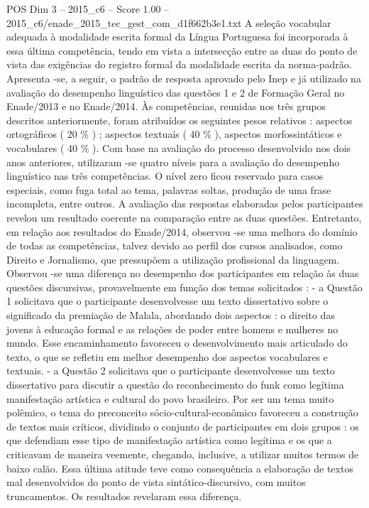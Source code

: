 \begin{textsample}{POS Dim 3 – 2015\_c6 – Score 1.00 – 2015\_c6/enade\_2015\_tec\_gest\_com\_d1f662b3e1.txt}
A seleção vocabular adequada à modalidade escrita formal da Língua Portuguesa foi incorporada à essa última competência, tendo em vista a intersecção entre as duas do ponto de vista das exigências do registro formal da modalidade escrita da norma-padrão.
Apresenta -se, a seguir, o padrão de resposta aprovado pelo Inep e já utilizado na avaliação do desempenho linguístico das questões 1 e 2 de Formação Geral no Enade/2013 e no Enade/2014.
Às competências, reunidas nos três grupos descritos anteriormente, foram atribuídos os seguintes pesos relativos : aspectos ortográficos ( 20 \% ) ; aspectos textuais ( 40 \% ), aspectos morfossintáticos e vocabulares ( 40 \% ).
Com base na avaliação do processo desenvolvido nos dois anos anteriores, utilizaram -se quatro níveis para a avaliação do desempenho linguístico nas três competências.
O nível zero ficou reservado para casos especiais, como fuga total ao tema, palavras soltas, produção de uma frase incompleta, entre outros.
A avaliação das respostas elaboradas pelos participantes revelou um resultado coerente na comparação entre as duas questões.
Entretanto, em relação aos resultados do Enade/2014, observou -se uma melhora do domínio de todas as competências, talvez devido ao perfil dos cursos analisados, como Direito e Jornalismo, que pressupõem a utilização profissional da linguagem.
Observou -se uma diferença no desempenho dos participantes em relação às duas questões discursivas, provavelmente em função dos temas solicitados : - a Questão 1 solicitava que o participante desenvolvesse um texto dissertativo sobre o significado da premiação de Malala, abordando dois aspectos : o direito das jovens à educação formal e as relações de poder entre homens e mulheres no mundo.
Esse encaminhamento favoreceu o desenvolvimento mais articulado do texto, o que se refletiu em melhor desempenho dos aspectos vocabulares e textuais. - a Questão 2 solicitava que o participante desenvolvesse um texto dissertativo para discutir a questão do reconhecimento do funk como legítima manifestação artística e cultural do povo brasileiro.
Por ser um tema muito polêmico, o tema do preconceito sócio-cultural-econômico favoreceu a construção de textos mais críticos, dividindo o conjunto de participantes em dois grupos : os que defendiam esse tipo de manifestação artística como legítima e os que a criticavam de maneira veemente, chegando, inclusive, a utilizar muitos termos de baixo calão.
Essa última atitude teve como consequência a elaboração de textos mal desenvolvidos do ponto de vista sintático-discursivo, com muitos truncamentos.
Os resultados revelaram essa diferença.

\end{textsample}
